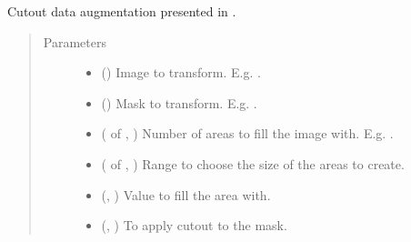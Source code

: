 \documentclass[letterpaper,10pt,english]{sphinxmanual}
\begin{document}
\begin{fulllineitems}
\label{\detokenize{data/generators/augmentors:data.generators.augmentors.cutout}}
Cutout data augmentation presented in .
\begin{quote}\begin{description}
\item[{Parameters}] \leavevmode\begin{itemize}
\item {} 
 () \textendash{} Image to transform. E.g. .

\item {} 
 () \textendash{} Mask to transform. E.g. .

\item {} 
 ( of , ) \textendash{} Number of areas to fill the image with. E.g. .

\item {} 
 ( of , ) \textendash{} Range to choose the size of the areas to create.

\item {} 
 (, ) \textendash{} Value to fill the area with.

\item {} 
 (, ) \textendash{} To apply cutout to the mask.

\end{itemize}


\end{description}
\end{quote}
\end{fulllineitems}
\end{document}
